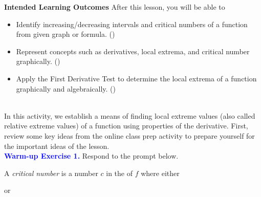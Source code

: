 \documentclass[10pt]{article}
\begin{document}
\pagestyle{otherpages}
\thispagestyle{firstpage}

\textbf{Intended Learning Outcomes}
After this lesson, you will be able to 

\begin{itemize}
    \item Identify increasing/decreasing intervals and critical numbers of a function from given graph or formula. ()
    \item Represent concepts such as derivatives, local extrema, and critical number graphically. ()
    \item Apply the First Derivative Test to determine the local extrema of a function graphically and algebraically. ()
\end{itemize}

\vspace{-0.5cm}

\hrulefill\\
In this activity, we establish a means of finding local extreme values (also called relative extreme values) of a function using properties of the derivative. First, review some key ideas from the online class prep activity to prepare yourself for the important ideas of the lesson.\\

{\bf \textcolor{blue}{Warm-up Exercise 1.}}  Respond to the prompt below.
%
    {
    A {\em critical number} is  a number $c$ in the  of $f$ where either
  \begin{center}  \quad\quad\quad or \quad\quad\quad {} \end{center}
    }
    
\end{document}
